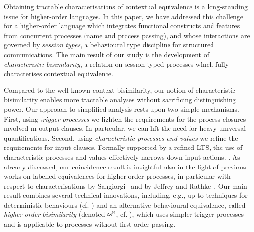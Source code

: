 
Obtaining tractable characterisations of contextual equivalence 
is a long-standing issue for higher-order  languages. 
In this paper, we have addressed this challenge for a higher-order language 
which integrates functional constructs and  features from concurrent processes (name and process passing), and 
whose interactions are governed by \emph{session types}, a behavioural type discipline for structured communications.
The main result of our study is the development of \emph{characteristic bisimilarity}, 
a relation on session typed processes which fully characterises contextual equivalence.

Compared to 
the well-known 
context bisimilarity, our notion of 
characteristic bisimilarity 
enables more tractable analyses without sacrificing distinguishing power. 
Our approach to simplified analysis rests upon two simple mechanisms. 
First, 
using \emph{trigger processes} 
we lighten the requirements for the process closures involved in output clauses. 
In particular, we can lift the need for heavy universal quantifications. 
Second, using \emph{characteristic processes and values} we refine the requirements for input clauses.
Formally supported by a refined LTS, the use of characteristic processes and values effectively narrows down
input actions.
.
As already discussed, our coincidence result is insightful also in the light of previous works on labelled equivalences 
for higher-order processes, in particular with respect to characterisations 
by Sangiorgi~\cite{SangiorgiD:expmpa,San96H} and by Jeffrey and Rathke~\cite{JeffreyR05}. Our main result 
combines several technical innovations, including, e.g., 
up-to techniques for deterministic behaviours (cf. )
and an alternative behavioural equivalence, called \emph{higher-order bisimilarity}
(denoted $\approx^\mathtt{H}$, cf. ), which 
uses simpler trigger processes and 
is applicable to processes without first-order passing. 

